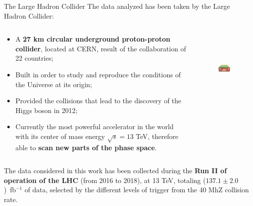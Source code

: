 \documentclass[8pt]{beamer}
\begin{document}
\begin{frame}{The Large Hadron Collider}
\justifying
The data analyzed \alert{has been taken by the Large Hadron Collider}:

\begin{columns}
	\begin{column}{0.55	\textwidth}
	\begin{itemize}
\justifying
\item A \textbf{27 km circular underground proton-proton collider}, located at CERN, result of the collaboration of 22 countries;
\item Built in order to study and reproduce the conditions of the Universe at its origin;
\item Provided the collisions that lead to the discovery of the Higgs boson in 2012;%
\item Currently the most powerful accelerator in the world with its center of mass energy $\sqrt{s} = 13$ TeV, therefore able to \textbf{scan new parts of the phase space}.
\end{itemize}
	\end{column}
	\begin{column}{0.48\textwidth}
	\begin{figure}[htbp]
\begin{center}
\includegraphics[width=5cm, height=3.6cm]{figs/LHCunderground.png}
\end{center}
\end{figure}
	\end{column}
\end{columns} \vfill

\vspace{10pt}
The data considered in this work has been collected during the \textbf{Run II of operation of the LHC} (from 2016 to 2018), at 13 TeV, totaling ($137.1 \pm 2.0$)~fb$^{-1}$ of data, selected by the different levels of trigger from the 40 MhZ collision rate. \vfill
\end{frame} 
\end{document}
